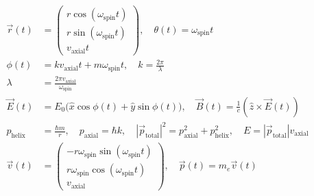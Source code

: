 \[
\boxed{
\begin{aligned}
\vec{r}(t) &=
\begin{pmatrix}
r \cos(\omega_\text{spin} t) \\
r \sin(\omega_\text{spin} t) \\
v_\text{axial} t
\end{pmatrix}, \quad
\theta(t) = \omega_\text{spin} t \\
\phi(t) &= k v_\text{axial} t + m \omega_\text{spin} t, \quad
k = \frac{2\pi}{\lambda} \\
\lambda &= \frac{2\pi v_\text{axial}}{\omega_\text{spin}} \\
\vec{E}(t) &= E_0 \big(\hat{x} \cos \phi(t) + \hat{y} \sin \phi(t) \big), \quad
\vec{B}(t) = \frac{1}{c} (\hat{z} \times \vec{E}(t)) \\
p_\text{helix} &= \frac{\hbar m}{r}, \quad
p_\text{axial} = \hbar k, \quad
|\vec{p}_\text{total}|^2 = p_\text{axial}^2 + p_\text{helix}^2, \quad
E = |\vec{p}_\text{total}| v_\text{axial} \\
\vec{v}(t) &= 
\begin{pmatrix}
- r \omega_\text{spin} \sin(\omega_\text{spin} t) \\
r \omega_\text{spin} \cos(\omega_\text{spin} t) \\
v_\text{axial}
\end{pmatrix}, \quad
\vec{p}(t) = m_e \vec{v}(t)
\end{aligned}
}
\]